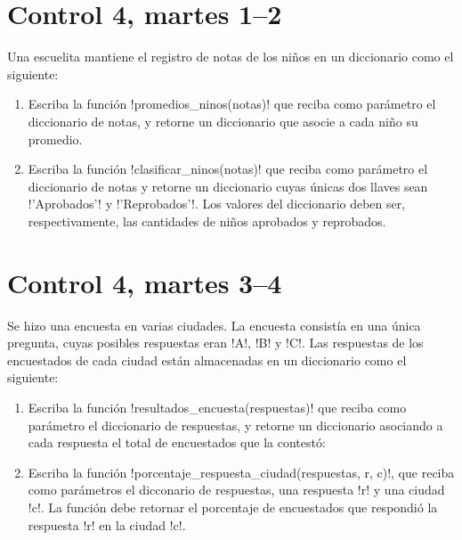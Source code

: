\documentclass[12pt,spanish,a5paper,landscape]{article}
\begin{document}
  \part*{Control 4, martes 1--2}
  \newpage

  Una escuelita mantiene el registro de notas de los niños
  en un diccionario como el siguiente:
  

  \begin{enumerate}

    \item
      Escriba la función \li!promedios_ninos(notas)!
      que reciba como parámetro el diccionario de notas,
      y retorne un diccionario que asocie a cada niño su promedio.
      

    \item
      Escriba la función \li!clasificar_ninos(notas)!
      que reciba como parámetro el diccionario de notas
      y retorne un diccionario cuyas únicas dos llaves sean
      \li!'Aprobados'! y \li!'Reprobados'!.
      Los valores del diccionario deben ser, respectivamente,
      las cantidades de niños aprobados y reprobados.
      

  \end{enumerate}

  \newpage

  \part*{Control 4, martes 3--4}
  \newpage

  Se hizo una encuesta en varias ciudades.
  La encuesta consistía en una única pregunta,
  cuyas posibles respuestas eran \li!A!, \li!B! y \li!C!.
  Las respuestas de los encuestados de cada ciudad
  están almacenadas en un diccionario como el siguiente:
  

  \begin{enumerate}

    \item
      Escriba la función \li!resultados_encuesta(respuestas)!
      que reciba como parámetro el diccionario de respuestas,
      y retorne un diccionario asociando a cada respuesta
      el total de encuestados que la contestó:
      

    \item
      Escriba la función \li!porcentaje_respuesta_ciudad(respuestas, r, c)!,
      que reciba como parámetros el dicconario de respuestas,
      una respuesta \li!r! y una ciudad \li!c!.
      La función debe retornar el porcentaje de encuestados que respondió
      la respuesta \li!r! en la ciudad \li!c!.
      


  \end{enumerate}
\end{document}
